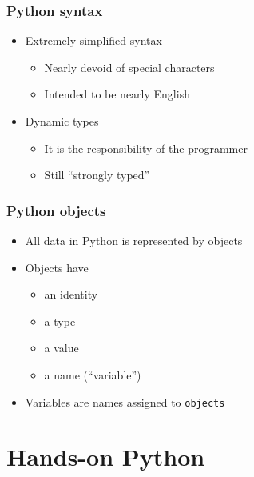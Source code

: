 \documentclass[xcolor=table,10pt,final]{beamer}
\begin{document}
\begin{frame}
  \frametitle{Python syntax}
  \begin{itemize}
    \item Extremely simplified syntax
      \begin{itemize}
        \item Nearly devoid of special characters
        \item Intended to be nearly English
      \end{itemize}
    \item Dynamic types
      \begin{itemize}
        \item It is the responsibility of the programmer
        \item Still ``strongly typed''
      \end{itemize}
  \end{itemize}
\end{frame}

\begin{frame}[fragile]
  \frametitle{Python objects}
  \begin{itemize}
    \item All data in Python is represented by objects
    \item Objects have
      \begin{itemize}
        \item an identity
        \item a type
        \item a value
        \item a name (``variable'')
      \end{itemize}
    \item Variables are names assigned to {\tt objects}
  \end{itemize}
\end{frame}

\section{Hands-on Python}
\frame{\sectionpage}
\end{document}
